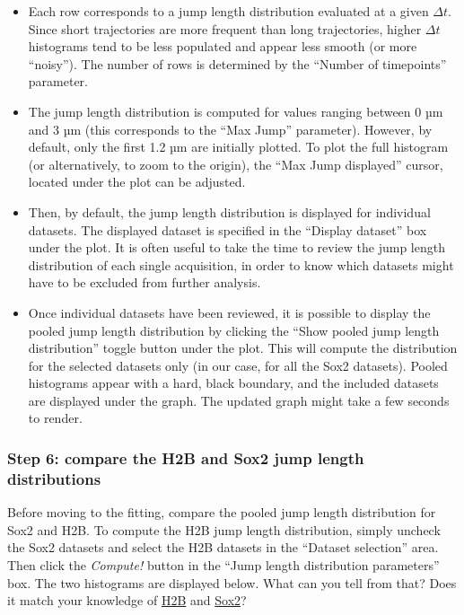 \begin{itemize}
\item Each row corresponds to a jump length distribution evaluated at a given \(\Delta t\). Since short trajectories are more frequent than long trajectories, higher \(\Delta t\) histograms tend to be less populated and appear less smooth (or more ``noisy''). The number of rows is determined by the ``Number of timepoints'' parameter.
\item The jump length distribution is computed for values ranging between 0 µm and 3 µm (this corresponds to the ``Max Jump'' parameter). However, by default, only the first 1.2 µm are initially plotted. To plot the full histogram (or alternatively, to zoom to the origin), the ``Max Jump displayed'' cursor, located under the plot can be adjusted. 
\item Then, by default, the jump length distribution is displayed for individual datasets. The displayed dataset is specified in the ``Display dataset'' box under the plot. It is often useful to take the time to review the jump length distribution of each single acquisition, in order to know which datasets might have to be excluded from further analysis.
\item Once individual datasets have been reviewed, it is possible to display the pooled jump length distribution by clicking the ``Show pooled jump length distribution'' toggle button under the plot. This will compute the distribution for the selected datasets only (in our case, for all the Sox2 datasets). Pooled histograms appear with a hard, black boundary, and the included datasets are displayed under the graph. The updated graph might take a few seconds to render.

\end{itemize}


\subsubsection{Step 6: compare the H2B and Sox2 jump length distributions}
Before moving to the fitting, compare the pooled jump length distribution for Sox2 and H2B. To compute the H2B jump length distribution, simply uncheck the Sox2 datasets and select the H2B datasets in the ``Dataset selection'' area. Then click the \textit{Compute!} button in the ``Jump length distribution parameters'' box. The two histograms are displayed below. What can you tell from that? Does it match your knowledge of \href{https://en.wikipedia.org/wiki/Histone_H2B}{H2B} and \href{https://en.wikipedia.org/wiki/SOX2}{Sox2}?\\

